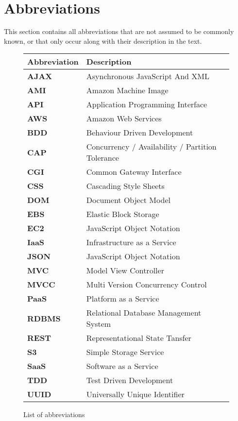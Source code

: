 \section{Abbreviations}

This section contains all abbreviations that are not assumed to be commonly known, or that only occur along with their description in the text.

\medskip
\begin{figure}[H]
  \begin{tabular}{ | l | l | }
    \hline
    \textbf{Abbreviation} & \textbf{Description} \\ 
    \hline\hline
    \textbf{AJAX} & Asynchronous JavaScript And XML \\ \hline
    \textbf{AMI} & Amazon Machine Image \\ \hline
    \textbf{API} & Application Programming Interface \\ \hline
    \textbf{AWS} & Amazon Web Services \\ \hline
    \textbf{BDD} & Behaviour Driven Development \\ \hline
    \textbf{CAP} & Concurrency / Availability / Partition Tolerance \\ \hline
    \textbf{CGI} & Common Gateway Interface \\ \hline
    \textbf{CSS} & Cascading Style Sheets \\ \hline
    \textbf{DOM} & Document Object Model \\ \hline
    \textbf{EBS} & Elastic Block Storage \\ \hline
    \textbf{EC2} & JavaScript Object Notation \\ \hline
    \textbf{IaaS} & Infrastructure as a Service \\ \hline
    \textbf{JSON} & JavaScript Object Notation \\ \hline
    \textbf{MVC} & Model View Controller \\ \hline
    \textbf{MVCC} & Multi Version Concurrency Control \\ \hline
    \textbf{PaaS} & Platform as a Service \\ \hline
    \textbf{RDBMS} & Relational Database Management System \\ \hline
    \textbf{REST} & Representational State Tansfer \\ \hline
    \textbf{S3} & Simple Storage Service \\ \hline
    \textbf{SaaS} & Software as a Service \\ \hline
    \textbf{TDD} & Test Driven Development \\ \hline
    \textbf{UUID} & Universally Unique Identifier \\ 
    \hline
  \end{tabular}
  \caption{List of abbreviations}
  \label{figure:abkuerzungen}
\end{figure}

